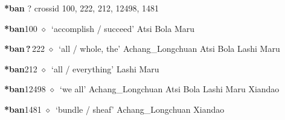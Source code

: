 \item
\textbf{*ban}
?
  {\tiny crossid 100, 222, 212, 12498, 1481}
  \begin{list}{}{\leftmargin=1.5em \itemindent=-1.5em}
  \item {\footnotesize \textbf{*ban}}{\tiny 100}
         $\diamond$~`accomplish / succeed'
         Atsi 
\hspace{1ex}
         Bola 
\hspace{1ex}
         Maru 
  \item {\footnotesize \textbf{*ban\,?\,}}{\tiny 222}
\hspace{1ex}
         $\diamond$~`all / whole, the'
         Achang\_Longchuan 
\hspace{1ex}
         Atsi 
\hspace{1ex}
         Bola 
\hspace{1ex}
         Lashi 
\hspace{1ex}
         Maru 
  \item {\footnotesize \textbf{*ban}}{\tiny 212}
\hspace{1ex}
         $\diamond$~`all / everything'
         Lashi 
\hspace{1ex}
         Maru 
  \item {\footnotesize \textbf{*ban}}{\tiny 12498}
\hspace{1ex}
         $\diamond$~`we all'
         Achang\_Longchuan 
\hspace{1ex}
         Atsi 
\hspace{1ex}
         Bola 
\hspace{1ex}
         Lashi 
\hspace{1ex}
         Maru 
\hspace{1ex}
         Xiandao 
  \item {\footnotesize \textbf{*ban}}{\tiny 1481}
\hspace{1ex}
         $\diamond$~`bundle / sheaf'
         Achang\_Longchuan 
\hspace{1ex}
         Xiandao 
  \end{list}
